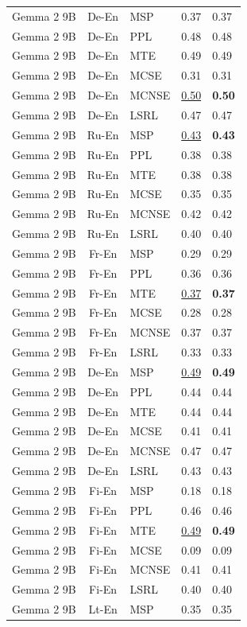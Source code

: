 \begin{table}
\begin{tabular}{lc}
Gemma 2 9B & De-En & MSP & 0.37 & 0.37 \\
Gemma 2 9B & De-En & PPL & 0.48 & 0.48 \\
Gemma 2 9B & De-En & MTE & 0.49 & 0.49 \\
Gemma 2 9B & De-En & MCSE & 0.31 & 0.31 \\
Gemma 2 9B & De-En & MCNSE & \underline{0.50} & \textbf{0.50} \\
Gemma 2 9B & De-En & LSRL & 0.47 & 0.47 \\
Gemma 2 9B & Ru-En & MSP & \underline{0.43} & \textbf{0.43} \\
Gemma 2 9B & Ru-En & PPL & 0.38 & 0.38 \\
Gemma 2 9B & Ru-En & MTE & 0.38 & 0.38 \\
Gemma 2 9B & Ru-En & MCSE & 0.35 & 0.35 \\
Gemma 2 9B & Ru-En & MCNSE & 0.42 & 0.42 \\
Gemma 2 9B & Ru-En & LSRL & 0.40 & 0.40 \\
Gemma 2 9B & Fr-En & MSP & 0.29 & 0.29 \\
Gemma 2 9B & Fr-En & PPL & 0.36 & 0.36 \\
Gemma 2 9B & Fr-En & MTE & \underline{0.37} & \textbf{0.37} \\
Gemma 2 9B & Fr-En & MCSE & 0.28 & 0.28 \\
Gemma 2 9B & Fr-En & MCNSE & 0.37 & 0.37 \\
Gemma 2 9B & Fr-En & LSRL & 0.33 & 0.33 \\
Gemma 2 9B & De-En & MSP & \underline{0.49} & \textbf{0.49} \\
Gemma 2 9B & De-En & PPL & 0.44 & 0.44 \\
Gemma 2 9B & De-En & MTE & 0.44 & 0.44 \\
Gemma 2 9B & De-En & MCSE & 0.41 & 0.41 \\
Gemma 2 9B & De-En & MCNSE & 0.47 & 0.47 \\
Gemma 2 9B & De-En & LSRL & 0.43 & 0.43 \\
Gemma 2 9B & Fi-En & MSP & 0.18 & 0.18 \\
Gemma 2 9B & Fi-En & PPL & 0.46 & 0.46 \\
Gemma 2 9B & Fi-En & MTE & \underline{0.49} & \textbf{0.49} \\
Gemma 2 9B & Fi-En & MCSE & 0.09 & 0.09 \\
Gemma 2 9B & Fi-En & MCNSE & 0.41 & 0.41 \\
Gemma 2 9B & Fi-En & LSRL & 0.40 & 0.40 \\
Gemma 2 9B & Lt-En & MSP & 0.35 & 0.35 \\

\end{tabular}
\end{table}
